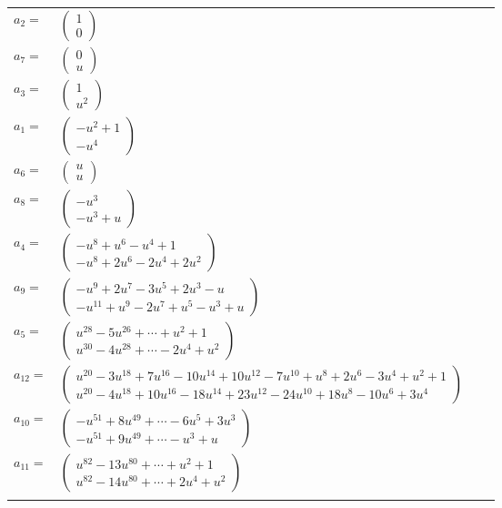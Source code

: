 \documentclass[1p]{elsarticle_modified}
\theoremstyle{definition}
\begin{document}
\begin{tabular}{m{7pt} m{180pt} m{7pt} m{180pt} }
\flushright $a_{2}=$&$\begin{pmatrix}1\\0\end{pmatrix}$ \\
\flushright $a_{7}=$&$\begin{pmatrix}0\\u\end{pmatrix}$ \\
\flushright $a_{3}=$&$\begin{pmatrix}1\\u^2\end{pmatrix}$ \\
\flushright $a_{1}=$&$\begin{pmatrix}- u^2+1\\- u^4\end{pmatrix}$ \\
\flushright $a_{6}=$&$\begin{pmatrix}u\\u\end{pmatrix}$ \\
\flushright $a_{8}=$&$\begin{pmatrix}- u^3\\- u^3+u\end{pmatrix}$ \\
\flushright $a_{4}=$&$\begin{pmatrix}- u^8+u^6- u^4+1\\- u^8+2 u^6-2 u^4+2 u^2\end{pmatrix}$ \\
\flushright $a_{9}=$&$\begin{pmatrix}- u^9+2 u^7-3 u^5+2 u^3- u\\- u^{11}+u^9-2 u^7+u^5- u^3+u\end{pmatrix}$ \\
\flushright $a_{5}=$&$\begin{pmatrix}u^{28}-5 u^{26}+\cdots+u^2+1\\u^{30}-4 u^{28}+\cdots-2 u^4+u^2\end{pmatrix}$ \\
\flushright $a_{12}=$&$\begin{pmatrix}u^{20}-3 u^{18}+7 u^{16}-10 u^{14}+10 u^{12}-7 u^{10}+u^8+2 u^6-3 u^4+u^2+1\\u^{20}-4 u^{18}+10 u^{16}-18 u^{14}+23 u^{12}-24 u^{10}+18 u^8-10 u^6+3 u^4\end{pmatrix}$ \\
\flushright $a_{10}=$&$\begin{pmatrix}- u^{51}+8 u^{49}+\cdots-6 u^5+3 u^3\\- u^{51}+9 u^{49}+\cdots- u^3+u\end{pmatrix}$ \\
\flushright $a_{11}=$&$\begin{pmatrix}u^{82}-13 u^{80}+\cdots+u^2+1\\u^{82}-14 u^{80}+\cdots+2 u^4+u^2\end{pmatrix}$\\&\end{tabular}
\end{document}
